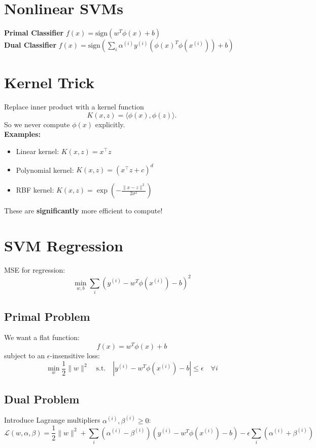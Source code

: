 \documentclass[11pt]{article}
\begin{document}
\pagebreak
\section*{Nonlinear SVMs}
\textbf{Primal Classifier} \(f(x) = \text{sign}(w^T \phi (x) + b)\) \\
\textbf{Dual Classifier} \(f(x) = \text{sign}\left( \sum_i \alpha^{(i)} y^{(i)} (\phi{(x)^T\phi{(x^{(i)})}}) + b \right)\) \\

\section*{Kernel Trick}

Replace inner product with a kernel function
\[
	K(x,z) = \langle \phi(x), \phi(z)\rangle.
\]
So we never compute $\phi(x)$ explicitly. \\

\textbf{Examples:}
\begin{itemize}
	\item Linear kernel: $K(x,z) = x^\top z$
	\item Polynomial kernel: $K(x,z) = (x^\top z + c)^d$
	\item RBF kernel: $K(x,z) = \exp\!\left(-\tfrac{\|x-z\|^2}{2\sigma^2}\right)$
\end{itemize}
These are \textbf{significantly} more efficient to compute!

\pagebreak

\section*{SVM Regression}
MSE for regression:
\[
	\min_{w,b} \sum_i (y^{(i)} - w^T \phi{(x^{(i)})} - b)^2
\]

\subsection*{Primal Problem}
We want a flat function:
\[
	f(x) = w^T \phi(x) + b
\]
subject to an $\epsilon$-insensitive loss:
\[
	\min_{w} \frac{1}{2}\|w\|^2
	\quad \text{s.t.} \quad |y^{(i)} - w^T \phi(x^{(i)}) - b| \leq \epsilon \quad \forall i
\]


\subsection*{Dual Problem}
Introduce Lagrange multipliers $\alpha^{(i)}, \beta^{(i)} \geq 0$:
\[
	\mathcal{L}(w,\alpha,\beta)
	= \frac{1}{2}\|w\|^2
	+ \sum_i (\alpha^{(i)} - \beta^{(i)})(y^{(i)} - w^T\phi(x^{(i)}) - b)
	- \epsilon \sum_i (\alpha^{(i)} + \beta^{(i)})
\]
\end{document}
